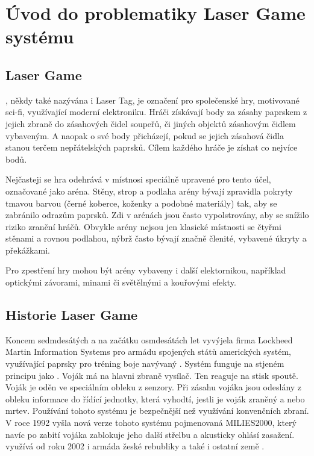 \section{Úvod do problematiky Laser Game systému}

\subsection{Laser Game}
, někdy také nazývána i Laser Tag, je označení pro společenské hry, motivované sci-fi, využívající moderní elektroniku. Hráči získávají body za zásahy  paprskem z jejich zbraně do zásahových čidel soupeřů, či jiných objektů zásahovým čidlem vybaveným. A naopak o své body přicházejí, pokud se jejich zásahová čidla stanou terčem nepřátelských  paprsků. Cílem každého hráče je zíshat co nejvíce bodů.

Nejčasteji se hra odehrává v místnosi speciálně upravené pro tento účel, označované jako aréna. Stěny, strop a podlaha arény bývají zpravidla pokryty tmavou barvou (černé koberce, koženky a podobné materiály) tak, aby se zabránilo odrazům  paprsků. Zdi v arénách jsou často vypolstrovány, aby se snížilo riziko zranění hráčů. Obvykle arény nejsou jen klasické místnosti se čtyřmi stěnami a rovnou podlahou, nýbrž často bývají značně členité, vybavené úkryty a překážkami.

Pro zpestření hry mohou být arény vybaveny i další elektornikou, například optickými závorami, minami či světělnými a kouřovými efekty.



\subsection{Historie Laser Game}
Koncem sedmdesátých a na začátku osmdesátách let vyvýjela firma Lockheed Martin Information Systems pro armádu spojených států amerických systém, využívající  paprsky pro tréning boje navývaný . Systém funguje na stjeném principu jako . Voják má na hlavni zbraně  vysílač. Ten reaguje na stisk spoutě. Voják je oděn ve speciálním obleku z  senzory. Při zásahu vojáka jsou odeslány z obleku informace do řídící jednotky, která vyhodtí, jestli je voják zraněný a nebo mrtev. Používání tohoto systému je bezpečnější než využívání konvenčních zbraní. V roce 1992 vyšla nová verze tohoto systému pojmenovaná MILIES2000, který navíc po zabití vojáka zablokuje jeho další střelbu a akusticky ohlásí zasažení.  využívá od roku 2002 i armáda žeské rebubliky a  také i ostatní země .

